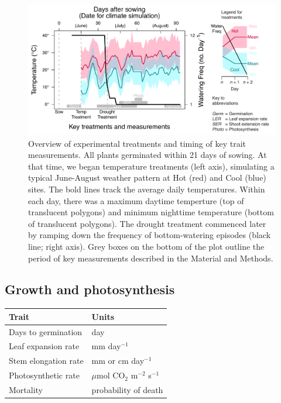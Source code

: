 \documentclass[11pt, oneside]{article}
\begin{document}

\begin{figure}[h!]
	\centerline{\includegraphics[width=1\textwidth]{Figures/Figure_ExptlDes.pdf}}
	\fontsize{10}{12}
	\selectfont
	\caption[Experimental Design]{Overview of experimental treatments and timing of key trait measurements. All plants germinated within 21 days of sowing. At that time, we began temperature treatments (left axis), simulating a typical June-August weather pattern at Hot (red) and Cool (blue) sites. The bold lines track the average daily temperatures. Within each day, there was a maximum daytime temperture (top of translucent polygons) and minimum nighttime temperature (bottom of translucent polygons). The drought treatment commenced later by ramping down the frequency of bottom-watering episodes (black line; right axis). Grey boxes on the bottom of the plot outline the period of key measurements described in the Material and Methods.}
	\label{fig:Fig_ExptlDes}
\end{figure}

\subsection*{Growth and photosynthesis}


\begin{table}[ht]
   \centering
   \begin{tabular}{@{} ll @{}}
      \toprule
  Trait & Units \\
      \midrule
  Days to germination  & day \\
  Leaf expansion rate  &  mm day$^{-1}$  \\
  Stem elongation rate  &  mm or cm day$^{-1}$  \\
  Photosynthetic rate &  $\mu$mol CO$_2$ m$^{-2}$ s$^{-1}$\\
  Mortality & probability of death  \\
	    \bottomrule
   \end{tabular}
   \label{table:Table_traits}
\end{table}
\end{document}
